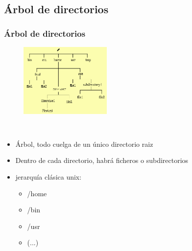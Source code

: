 \documentclass[ucs]{beamer}
\begin{document}
\subsection{Árbol de directorios}
\begin{frame}[fragile]
\frametitle{Árbol de directorios}
\begin{minipage}{4.5cm}
\begin{figure}
\centerline{\includegraphics[width=4.5cm]{figs/unix-tree}}
\end{figure}
\end{minipage} \hfill
\
\begin{minipage}{4.5cm}
\begin{itemize} 
\item Árbol, todo cuelga de un único directorio raiz
\item Dentro de cada directorio, habrá ficheros o subdirectorios
\item jerarquía clásica unix:
        \begin{itemize}
        \item /home
        \item /bin
        \item /usr
        \item   (...)
        \end{itemize}
\end{itemize}
\end{minipage} \hfill
\end{frame}


\end{document}
